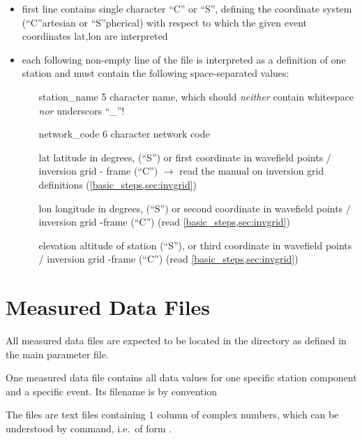 \begin{itemize}
\item first line contains single character ``C'' or ``S'', defining the coordinate system (``C''artesian or ``S''pherical)
  with respect to which the given event coordinates lat,lon are interpreted
\item each following non-empty line of the file is interpreted as a definition of one station and must 
  contain the following space-separated values:
  \begin{itemize}
  \item[station\_name] 5 character name, which should \emph{neither} contain whitespace \emph{nor} underscors ``\_''!
  \item[network\_code] 6 character network code
  \item[lat] latitude in degrees,  (``S'') or first coordinate in 
    wavefield points / inversion grid - frame (``C'') $\rightarrow$  read the manual on inversion grid definitions 
    (\ref{basic_steps,sec:invgrid})
  \item[lon] longitude in degrees,  (``S'') or second  coordinate in 
    wavefield points / inversion grid -frame (``C'') (read \ref{basic_steps,sec:invgrid})
  \item[elevation] altitude of station (``S''), or third coordinate in wavefield points / inversion grid -frame (``C'') (read \ref{basic_steps,sec:invgrid})
  \end{itemize}
\end{itemize}
%
\section{Measured Data Files} \label{files,sec:measured_data}
%
All measured data files are expected to be located in the directory  as defined
in the main parameter file.

One measured data file contains all data values for one specific station component and a specific event.
Its filename is by convention 

The files are text files containing $1$ column of  complex numbers, 
which can be understood by   command, i.e.\ of form  .

